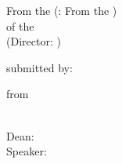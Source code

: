 \begin{titlepage}
{\begin{center}
        From the \@clinic{} (\bzw: From the \@institute{})\\
        of the \@faculty{}\\
        (Director: \@director{})

        \vspace*{6\baselineskip}
        {\large\@title{}}%
        \vspace*{6\baselineskip}%

        \@thesisType{}%
        
        \vspace*{4\baselineskip}%
        submitted by:\\
        \@author{}%
        
        \vspace*{\baselineskip}%
        from\\%
        \@birthplace{}\\
        \@thesisSumbit{}%
        \vfill%
        \vfill%
    \end{center}%

    \clearpage

    \pagestyle{plain}%
    \thispagestyle{empty}%
    
    \begin{center}
        \vspace*{\fill}
        \vspace*{\fill}
        \vspace*{\fill}
        \vspace*{\fill}

        Dean: \@deanOfInstitution{} \\
        Speaker: \@theSpeaker{}
        \vspace*{\fill}
        
    \end{center}
}

\end{titlepage}%
\makeatother%
%